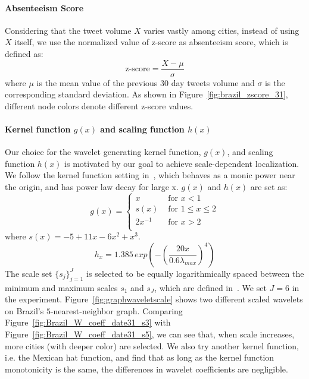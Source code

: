 \documentclass[twoside,leqno,twocolumn]{article}
\begin{document}

\paragraph{Absenteeism Score}
Considering that
the tweet volume $X$ varies vastly among cities, instead of using $X$ itself, we use the normalized value of z-score as absenteeism score, which is defined as:
\begin{equation}
\label{eq:Z_score}
\textrm{z-score} = \frac{X-\mu}{\sigma}
\end{equation}where $\mu$ is the mean value of the previous $30$ day tweets volume and $\sigma$ is the corresponding standard deviation. As shown in Figure~\ref{fig:brazil_zscore_31}, different
node colors denote different z-score values.

\paragraph{Kernel function $g(x)$ and scaling function $h(x)$}
Our choice for the wavelet generating kernel function, $g(x)$, and scaling function $h(x)$ is motivated by our goal to achieve scale-dependent localization. We follow the kernel function setting in~\cite{hammond2011wavelets}, which behaves as a monic power near the origin, and has power law decay for large x. $g(x)$ and $h(x)$ are set as:
\begin{equation}
g(x) = \left\{ \begin{array}{rl}
 x &\mbox{ for $x<1$} \\
s(x) &\mbox{ for $1\leq x \leq 2$} \\
 2x^{-1} &\mbox{ for $x>2$} \\
       \end{array} \right.
\end{equation} where $s(x)=-5+11x-6x^2+x^3$.
\begin{equation}
h_{x}= 1.385\, exp(-(\frac{20x}{0.6\lambda_{max}})^4)
\end{equation}
The scale set $\{s_j\}_{j=1}^J$ is selected to be equally logarithmically spaced between the minimum and maximum scales $s_1$ and $s_J$, which are defined in~\cite{hammond2011wavelets}. We set $J=6$ in the experiment. Figure~\ref{fig:graphwaveletscale} shows two different scaled wavelets on Brazil's $5$-nearest-neighbor graph. Comparing Figure~\ref{fig:Brazil_W_coeff_date31_s3} with Figure~\ref{fig:Brazil_W_coeff_date31_s5}, we can see that, when scale increases, more cities (with deeper color) are selected.
We also try another kernel function, i.e. the Mexican hat function, and find that as long as the kernel function monotonicity is the same,
the differences in wavelet coefficients are negligible.
\end{document}
